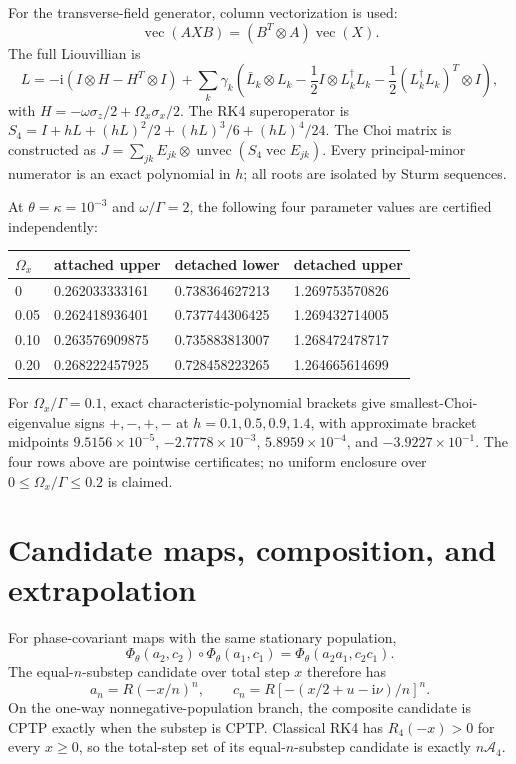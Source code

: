 \documentclass[11pt]{article}
\newcommand{\ii}{\mathrm{i}}
\begin{document}
For the transverse-field generator, column vectorization is used:
\begin{equation}
 \operatorname{vec}(AXB)=(B^T\otimes A)\operatorname{vec}(X).
\end{equation}
The full Liouvillian is
\begin{equation}
 L=-\ii(I\otimes H-H^T\otimes I)+\sum_k\gamma_k\left(\bar L_k\otimes L_k-\frac12I\otimes L_k^\dagger L_k-\frac12(L_k^\dagger L_k)^T\otimes I\right),
\end{equation}
with $H=-\omega\sigma_z/2+\Omega_x\sigma_x/2$. The RK4 superoperator is $S_4=I+hL+(hL)^2/2+(hL)^3/6+(hL)^4/24$. The Choi matrix is constructed as $J=\sum_{jk}E_{jk}\otimes\operatorname{unvec}(S_4\operatorname{vec}E_{jk})$. Every principal-minor numerator is an exact polynomial in $h$; all roots are isolated by Sturm sequences.

At $\theta=\kappa=10^{-3}$ and $\omega/\Gamma=2$, the following four parameter values are certified independently:
\begin{center}
\begin{tabular}{llll}
\toprule
$\Omega_x$ & attached upper & detached lower & detached upper\\
\midrule
0 & 0.262033333161 & 0.738364627213 & 1.269753570826\\
0.05 & 0.262418936401 & 0.737744306425 & 1.269432714005\\
0.10 & 0.263576909875 & 0.735883813007 & 1.268472478717\\
0.20 & 0.268222457925 & 0.728458223265 & 1.264665614699\\
\bottomrule
\end{tabular}
\end{center}
For $\Omega_x/\Gamma=0.1$, exact characteristic-polynomial brackets give smallest-Choi-eigenvalue signs $+,-,+,-$ at $h=0.1,0.5,0.9,1.4$, with approximate bracket midpoints $9.5156\times10^{-5}$, $-2.7778\times10^{-3}$, $5.8959\times10^{-4}$, and $-3.9227\times10^{-1}$. The four rows above are pointwise certificates; no uniform enclosure over $0\le\Omega_x/\Gamma\le0.2$ is claimed.

\section{Candidate maps, composition, and extrapolation}
For phase-covariant maps with the same stationary population,
\begin{equation}
 \Phi_\theta(a_2,c_2)\circ\Phi_\theta(a_1,c_1)=\Phi_\theta(a_2a_1,c_2c_1).
\end{equation}
The equal-$n$-substep candidate over total step $x$ therefore has
\begin{equation}
 a_n=R(-x/n)^n,\qquad c_n=R[-(x/2+u-\ii\nu)/n]^n.
\end{equation}
On the one-way nonnegative-population branch, the composite candidate is CPTP exactly when the substep is CPTP. Classical RK4 has $R_4(-x)>0$ for every $x\ge0$, so the total-step set of its equal-$n$-substep candidate is exactly $n\mathcal A_4$.
\end{document}
